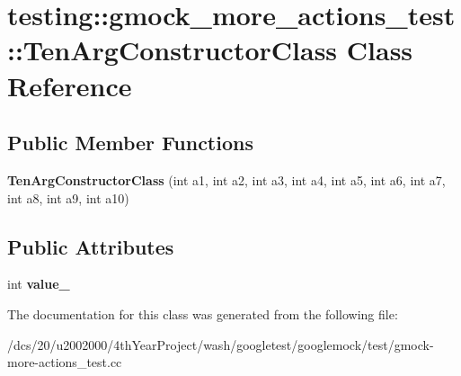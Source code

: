 \hypertarget{classtesting_1_1gmock__more__actions__test_1_1TenArgConstructorClass}{}\section{testing\+:\+:gmock\+\_\+more\+\_\+actions\+\_\+test\+:\+:Ten\+Arg\+Constructor\+Class Class Reference}
\label{classtesting_1_1gmock__more__actions__test_1_1TenArgConstructorClass}
\subsection*{Public Member Functions}
\begin{DoxyCompactItemize}
\item 
\mbox{\label{classtesting_1_1gmock__more__actions__test_1_1TenArgConstructorClass_af7bd6a1ae6b940e06c581a10b22a53a3}} 
{\bfseries Ten\+Arg\+Constructor\+Class} (int a1, int a2, int a3, int a4, int a5, int a6, int a7, int a8, int a9, int a10)
\end{DoxyCompactItemize}
\subsection*{Public Attributes}
\begin{DoxyCompactItemize}
\item 
\mbox{\label{classtesting_1_1gmock__more__actions__test_1_1TenArgConstructorClass_a47656edcb2920915d6d67489aac5160a}} 
int {\bfseries value\+\_\+}
\end{DoxyCompactItemize}


The documentation for this class was generated from the following file\+:\begin{DoxyCompactItemize}
\item 
/dcs/20/u2002000/4th\+Year\+Project/wash/googletest/googlemock/test/gmock-\/more-\/actions\+\_\+test.\+cc\end{DoxyCompactItemize}

